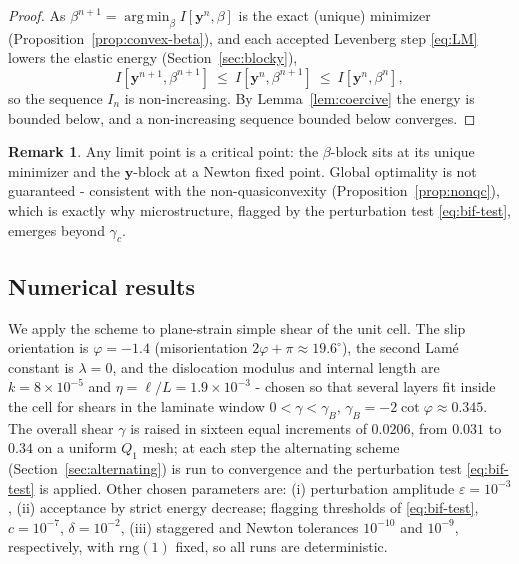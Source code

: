 \documentclass[12pt]{article}
\theoremstyle{plain}
\theoremstyle{definition}
\newtheorem{remark}[theorem]{Remark}
\newcommand{\by}{\bm{y}}
\DeclareMathOperator*{\argmin}{arg\,min}
\begin{document}
\begin{proof}
As $\beta^{n+1}=\argmin_\beta I[\by^{n},\beta]$ is the exact (unique) minimizer
(Proposition~\ref{prop:convex-beta}), and each accepted Levenberg step
\eqref{eq:LM} lowers the elastic energy (Section~\ref{sec:blocky}),
\begin{equation*}
  I[\by^{n+1},\beta^{n+1}]\ \le\ I[\by^{n},\beta^{n+1}]\ \le\
  I[\by^{n},\beta^{n}] ,
\end{equation*}
so the sequence $I_n$ is non-increasing. By Lemma~\ref{lem:coercive} the
energy is bounded below, and a non-increasing sequence bounded below converges.
\end{proof}

\begin{remark}\label{rem:cvg}
Any limit point is a critical point: the $\beta$-block sits at its unique minimizer and
the $\by$-block at a Newton fixed point. Global optimality is not guaranteed -
consistent with the non-quasiconvexity (Proposition~\ref{prop:nonqc}), which is
exactly why microstructure, flagged by the perturbation test
\eqref{eq:bif-test}, emerges beyond $\gamma_c$.
\end{remark}

\subsection{Numerical results}\label{sec:results}
We apply the scheme to plane-strain simple shear of the unit cell. The slip
orientation is $\varphi=-1.4$ (misorientation $2\varphi+\pi\approx19.6^\circ$),
the second Lam\'e constant is $\lambda=0$, and the dislocation modulus and
internal length are $k=8\times10^{-5}$ and $\eta=\ell/L=1.9\times10^{-3}$ -
chosen so that several layers fit inside the cell for shears in the
laminate window $0<\gamma<\gamma_B$, $\gamma_B=-2\cot\varphi\approx0.345$. The overall shear $\gamma$ is raised in sixteen equal increments of $0.0206$, from $0.031$ to $0.34$ on a uniform $Q_1$ mesh; at each step the alternating scheme
(Section~\ref{sec:alternating}) is run to convergence and the perturbation test
\eqref{eq:bif-test} is applied. Other chosen parameters are: (i) perturbation amplitude $\varepsilon=10^{-3}$, (ii) acceptance by strict energy decrease; flagging thresholds of \eqref{eq:bif-test}, $c=10^{-7}$, $\delta = 10^{-2}$, (iii) staggered and Newton tolerances $10^{-10}$ and $10^{-9}$, respectively, with $\mathrm{rng}(1)$ fixed, so all runs are deterministic.
\end{document}
